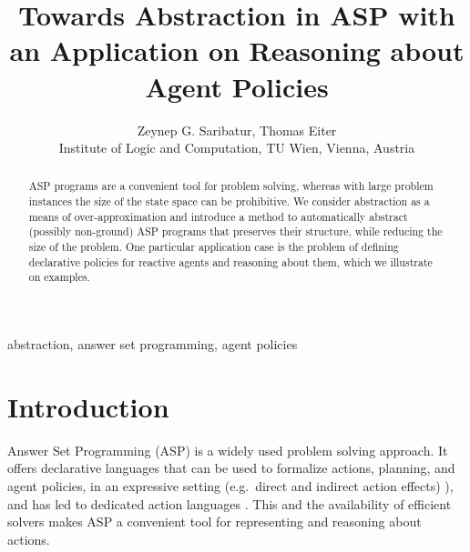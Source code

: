 \documentclass{new_tlp}
\title[Towards Abstraction in ASP with an Application on Reasoning about Agent Policies]
        {Towards Abstraction in ASP with an Application on Reasoning about Agent Policies}
\author[Z. G. Saribatur, T. Eiter]
         {Zeynep G. Saribatur, Thomas Eiter\\
         Institute of Logic and Computation, TU Wien, Vienna, Austria\\
         \email{\{zeynep,eiter\}@kr.tuwien.ac.at}}
\begin{document}
\label{firstpage}

\maketitle

  \begin{abstract}
   ASP programs are a convenient tool for problem solving, whereas with large problem instances the size of the state space can be prohibitive. We consider abstraction as a means of over-approximation and introduce a method to automatically abstract (possibly non-ground) ASP programs that preserves their structure, while reducing the size of the problem. One particular application case is the problem of defining declarative policies for reactive agents and reasoning about them, which we illustrate on examples.
  \end{abstract}

  \begin{keywords}
    abstraction, answer set programming, agent policies
  \end{keywords}


\section{Introduction}

Answer Set Programming (ASP) is a widely used problem solving
approach. It offers declarative languages that can be used 
to formalize actions, planning, and agent policies, in an expressive setting
(e.g.\ direct and indirect action effects)
\cite{lif99c,bara-2003,DBLP:journals/aim/ErdemGL16}),
and has led to dedicated action languages \cite{lifschitz08}.
This and the availability of efficient solvers
makes ASP a convenient tool for representing and reasoning about actions.
\end{document}

